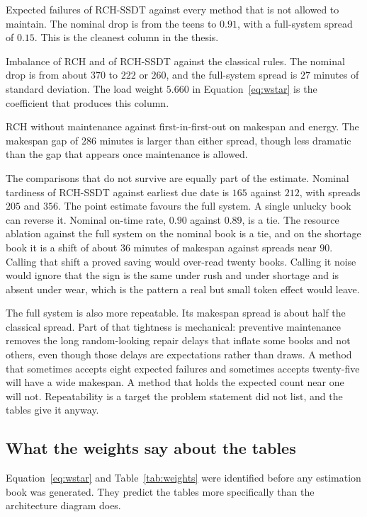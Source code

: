 Expected failures of RCH-SSDT against every method that is not allowed to maintain. The nominal drop is from the teens to \(0.91\), with a full-system spread of \(0.15\). This is the cleanest column in the thesis.

Imbalance of RCH and of RCH-SSDT against the classical rules. The nominal drop is from about \(370\) to \(222\) or \(260\), and the full-system spread is \(27\) minutes of standard deviation. The load weight \(5.660\) in Equation~\eqref{eq:wstar} is the coefficient that produces this column.

RCH without maintenance against first-in-first-out on makespan and energy. The makespan gap of \(286\) minutes is larger than either spread, though less dramatic than the gap that appears once maintenance is allowed.

The comparisons that do not survive are equally part of the estimate. Nominal tardiness of RCH-SSDT against earliest due date is \(165\) against \(212\), with spreads \(205\) and \(356\). The point estimate favours the full system. A single unlucky book can reverse it. Nominal on-time rate, \(0.90\) against \(0.89\), is a tie. The resource ablation against the full system on the nominal book is a tie, and on the shortage book it is a shift of about \(36\) minutes of makespan against spreads near \(90\). Calling that shift a proved saving would over-read twenty books. Calling it noise would ignore that the sign is the same under rush and under shortage and is absent under wear, which is the pattern a real but small token effect would leave.

The full system is also more repeatable. Its makespan spread is about half the classical spread. Part of that tightness is mechanical: preventive maintenance removes the long random-looking repair delays that inflate some books and not others, even though those delays are expectations rather than draws. A method that sometimes accepts eight expected failures and sometimes accepts twenty-five will have a wide makespan. A method that holds the expected count near one will not. Repeatability is a target the problem statement did not list, and the tables give it anyway.

\subsection{What the weights say about the tables}

Equation~\eqref{eq:wstar} and Table~\ref{tab:weights} were identified before any estimation book was generated. They predict the tables more specifically than the architecture diagram does.

